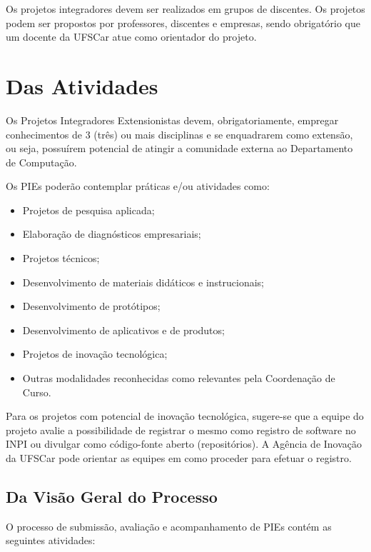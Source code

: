 \documentclass[11pt,a4paper]{report}
\begin{document}
Os projetos integradores devem ser realizados em grupos de discentes. Os projetos podem ser propostos por professores, discentes e empresas, sendo obrigatório que um docente da UFSCar atue como orientador do projeto.


\section{Das Atividades}

Os Projetos Integradores Extensionistas devem, obrigatoriamente, empregar conhecimentos de 3 (três) ou mais disciplinas e se enquadrarem como extensão, ou seja, possuírem potencial de atingir a comunidade externa ao Departamento de Computação.

Os PIEs poderão contemplar práticas e/ou atividades como:

\begin{itemize}
    \item Projetos de pesquisa aplicada;
    \item Elaboração de diagnósticos empresariais;
    \item Projetos técnicos;
    \item Desenvolvimento de materiais didáticos e instrucionais;
    \item Desenvolvimento de protótipos;
    \item Desenvolvimento de aplicativos e de produtos;
    \item Projetos de inovação tecnológica;
    \item Outras modalidades reconhecidas como relevantes pela Coordenação de Curso.
\end{itemize}

Para os projetos com potencial de inovação tecnológica, sugere-se que a equipe do projeto avalie a possibilidade de registrar o mesmo como registro de software no INPI ou divulgar como código-fonte aberto (repositórios). A Agência de Inovação da UFSCar pode orientar as equipes em como proceder para efetuar o registro.

\subsection{Da Visão Geral do Processo}

O processo de submissão, avaliação e acompanhamento de PIEs contém as seguintes atividades:
\end{document}
